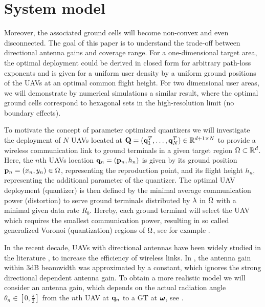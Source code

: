 \documentclass[smallabstract,smallcaptions]{dccpaper}
\newcounter{example}[section]
\newcommand{\philippstart}{\color{black}}
\newcommand{\philippend}{\color{black}}
\begin{document}
\section{System model}\label{sec:model}
%
\philippstart
{}


Moreover, the associated ground cells will become non-convex and even
disconnected.  The goal of this paper is to understand the trade-off between directional antenna gains and coverage
range. For a one-dimensional target area, the optimal deployment could be derived in closed form for arbitrary path-loss
exponents and is given for a uniform user density by a uniform ground positions of the UAVs at an optimal common flight
height. For two dimensional user areas, we will demonstrate by numerical simulations a similar result, where the optimal
ground cells correspond to hexagonal sets in the high-resolution limit (no boundary effects). 
\philippend
\fi

To motivate the concept of parameter optimized quantizers we will investigate the deployment of $N$ UAVs located at
$\mathbf Q=({\mathbf q}_1^T,\dots,{\mathbf q}_N^T)\in{\ensuremath{\mathbb R}}^{d+1\times N}$ to provide a wireless communication link to ground terminals in a given
target region  $\Omega\subset{\ensuremath{\mathbb R}}^d$. Here, the $n$th UAVs location ${\mathbf q}_n=({\mathbf p}_n,h_n)$ is given by its ground position
${\mathbf p}_n=(x_n,y_n)\in\Omega$, representing the reproduction point, and its flight height $h_n$, representing the additional
parameter of the quantizer.  The optimal UAV deployment (quantizer) is then defined by the minimal average communication
power (distortion) to serve ground terminals distributed by $\lambda$ in $\Omega$ with a minimal given data rate $R_b$. Hereby, each
ground terminal will select the UAV which requires the smallest communication power, resulting in  so called
generalized Voronoi (quantization) regions of $\Omega$, see for example \cite{Erdem}.

In the recent decade, UAVs with directional
antennas have been widely studied in the literature \cite{BJL,MSF,HA,KMR,HSYR,MWMM}, to increase the efficiency of wireless
links.   In \cite{BJL,MSF,HA,KMR,HSYR,MWMM}, the antenna gain within 3dB beamwidth was approximated by a constant, which
ignores  the strong directional dependent antenna gain. To
obtain a more realistic model we will consider an antenna gain, which depends on the actual radiation angle
$\theta_n\in[0,\frac{\pi}{2}]$ from the $n$th UAV at ${\mathbf q}_n$ to a GT at $\boldsymbol{ \omega}$,
see .
\end{document}
